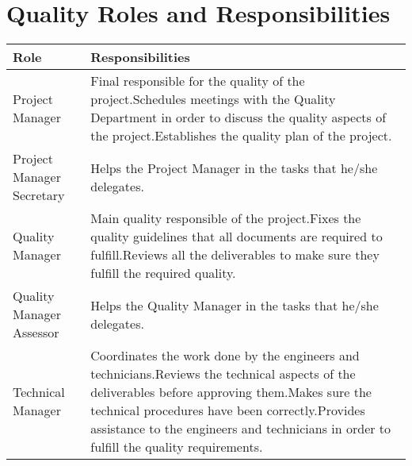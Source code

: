 \section{Quality Roles and Responsibilities}

\begin{longtable}[H]{>{\raggedright\arraybackslash}p{5cm} p{9cm}}
	
	\toprule[2pt]
	
	\textbf{Role} &  \textbf{Responsibilities}   \\
	
	\midrule [1.5pt]
	\endhead
	
	Project Manager & Final responsible for the quality of the project.\vspace{0.3cm}\newline Schedules meetings with the Quality Department in order to discuss the quality aspects of the project.\vspace{0.3cm}\newline Establishes the quality plan of the project.
	\vspace{0.2cm} \\
	
	\midrule
		
	Project Manager Secretary & Helps the Project Manager in the tasks that he/she delegates.
	\vspace{0.2cm} \\
	
	\midrule
	
	Quality Manager & Main quality responsible of the project.\vspace{0.3cm}\newline Fixes the quality guidelines that all documents are required to fulfill.\vspace{0.3cm}\newline Reviews all the deliverables to make sure they fulfill the required quality.
	\vspace{0.2cm} \\

	\midrule
	
	Quality Manager Assessor & Helps the Quality Manager in the tasks that he/she delegates.
	\vspace{0.2cm} \\
	
	\midrule
	
	Technical Manager & Coordinates the work done by the engineers and technicians.\vspace{0.3cm}\newline Reviews the technical aspects of the deliverables before approving them.\vspace{0.3cm}\newline Makes sure the technical procedures have been correctly.\vspace{0.3cm}\newline Provides assistance to the engineers and technicians in order to fulfill the quality requirements.
	\vspace{0.2cm} \\
	

\end{longtable}
